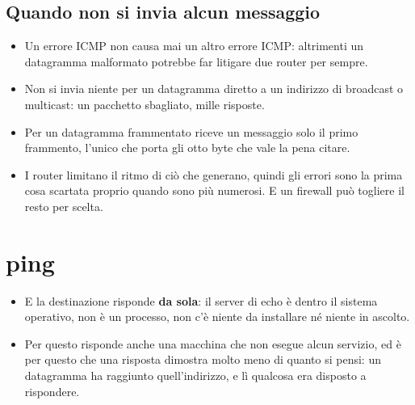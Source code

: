 \subsection{Quando non si invia alcun messaggio}

\begin{itemize}
    \item Un errore ICMP non causa mai un altro errore ICMP: altrimenti un datagramma malformato potrebbe far litigare due
          router per sempre.
    \item Non si invia niente per un datagramma diretto a un indirizzo di broadcast o multicast: un pacchetto sbagliato, mille
          risposte.
    \item Per un datagramma frammentato riceve un messaggio solo il primo frammento, l'unico che porta gli otto byte che vale
          la pena citare.
    \item I router limitano il ritmo di ciò che generano, quindi gli errori sono la prima cosa scartata proprio quando sono
          più numerosi. E un firewall può togliere il resto per scelta.
\end{itemize}


\section{ping}


\begin{itemize}
    \item E la destinazione risponde \textbf{da sola}: il server di echo è dentro il sistema operativo, non è un processo,
          non c'è niente da installare né niente in ascolto.
    \item Per questo risponde anche una macchina che non esegue alcun servizio, ed è per questo che una risposta dimostra molto
          meno di quanto si pensi: un datagramma ha raggiunto quell'indirizzo, e lì qualcosa era disposto a rispondere.
\end{itemize}

